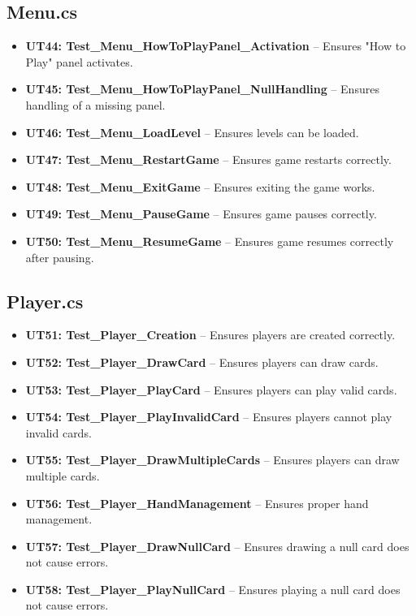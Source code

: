 \documentclass[12pt, titlepage]{article}
\begin{document}
\subsection{Menu.cs}
\begin{itemize}
    \item \textbf{UT44: Test\_Menu\_HowToPlayPanel\_Activation} -- Ensures "How to Play" panel activates.
    \item \textbf{UT45: Test\_Menu\_HowToPlayPanel\_NullHandling} -- Ensures handling of a missing panel.
    \item \textbf{UT46: Test\_Menu\_LoadLevel} -- Ensures levels can be loaded.
    \item \textbf{UT47: Test\_Menu\_RestartGame} -- Ensures game restarts correctly.
    \item \textbf{UT48: Test\_Menu\_ExitGame} -- Ensures exiting the game works.
    \item \textbf{UT49: Test\_Menu\_PauseGame} -- Ensures game pauses correctly.
    \item \textbf{UT50: Test\_Menu\_ResumeGame} -- Ensures game resumes correctly after pausing.
\end{itemize}

\subsection{Player.cs}
\begin{itemize}
    \item \textbf{UT51: Test\_Player\_Creation} -- Ensures players are created correctly.
    \item \textbf{UT52: Test\_Player\_DrawCard} -- Ensures players can draw cards.
    \item \textbf{UT53: Test\_Player\_PlayCard} -- Ensures players can play valid cards.
    \item \textbf{UT54: Test\_Player\_PlayInvalidCard} -- Ensures players cannot play invalid cards.
    \item \textbf{UT55: Test\_Player\_DrawMultipleCards} -- Ensures players can draw multiple cards.
    \item \textbf{UT56: Test\_Player\_HandManagement} -- Ensures proper hand management.
    \item \textbf{UT57: Test\_Player\_DrawNullCard} -- Ensures drawing a null card does not cause errors.
    \item \textbf{UT58: Test\_Player\_PlayNullCard} -- Ensures playing a null card does not cause errors.
\end{itemize}
\end{document}
